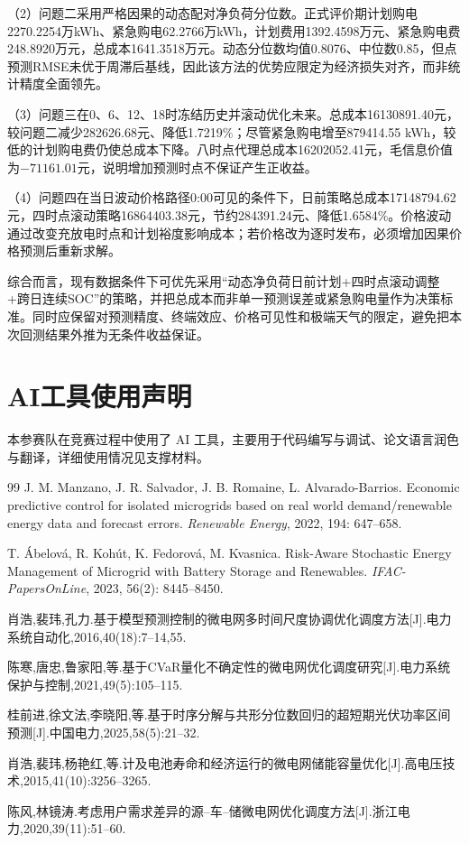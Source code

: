 \documentclass[UTF8,a4paper,12pt,fontset=fandol]{ctexart}
\numberwithin{equation}{section}
\begin{document}
（2）问题二采用严格因果的动态配对净负荷分位数。正式评价期计划购电2270.2254万kWh、紧急购电62.2766万kWh，计划费用1392.4598万元、紧急购电费248.8920万元，总成本1641.3518万元。动态分位数均值0.8076、中位数0.85，但点预测RMSE未优于周滞后基线，因此该方法的优势应限定为经济损失对齐，而非统计精度全面领先。

（3）问题三在0、6、12、18时冻结历史并滚动优化未来。总成本16130891.40元，较问题二减少282626.68元、降低1.7219\%；尽管紧急购电增至879414.55 kWh，较低的计划购电费仍使总成本下降。八时点代理总成本16202052.41元，毛信息价值为$-71161.01$元，说明增加预测时点不保证产生正收益。

（4）问题四在当日波动价格路径0:00可见的条件下，日前策略总成本17148794.62元，四时点滚动策略16864403.38元，节约284391.24元、降低1.6584\%。价格波动通过改变充放电时点和计划裕度影响成本；若价格改为逐时发布，必须增加因果价格预测后重新求解。

综合而言，现有数据条件下可优先采用“动态净负荷日前计划+四时点滚动调整+跨日连续SOC”的策略，并把总成本而非单一预测误差或紧急购电量作为决策标准。同时应保留对预测精度、终端效应、价格可见性和极端天气的限定，避免把本次回测结果外推为无条件收益保证。

\section{AI工具使用声明}
本参赛队在竞赛过程中使用了 AI 工具，主要用于代码编写与调试、论文语言润色与翻译，详细使用情况见支撑材料。

\begin{thebibliography}{99}
J. M. Manzano, J. R. Salvador, J. B. Romaine, L. Alvarado-Barrios.
Economic predictive control for isolated microgrids based on real world demand/renewable energy data and forecast errors.
\textit{Renewable Energy}, 2022, 194: 647--658.

T. Ábelová, R. Kohút, K. Fedorová, M. Kvasnica.
Risk-Aware Stochastic Energy Management of Microgrid with Battery Storage and Renewables.
\textit{IFAC-PapersOnLine}, 2023, 56(2): 8445--8450.

肖浩,裴玮,孔力.基于模型预测控制的微电网多时间尺度协调优化调度方法[J].电力系统自动化,2016,40(18):7--14,55.

陈寒,唐忠,鲁家阳,等.基于CVaR量化不确定性的微电网优化调度研究[J].电力系统保护与控制,2021,49(5):105--115.

桂前进,徐文法,李晓阳,等.基于时序分解与共形分位数回归的超短期光伏功率区间预测[J].中国电力,2025,58(5):21--32.

肖浩,裴玮,杨艳红,等.计及电池寿命和经济运行的微电网储能容量优化[J].高电压技术,2015,41(10):3256--3265.

陈风,林镜涛.考虑用户需求差异的源--车--储微电网优化调度方法[J].浙江电力,2020,39(11):51--60.
\end{thebibliography}
\end{document}
